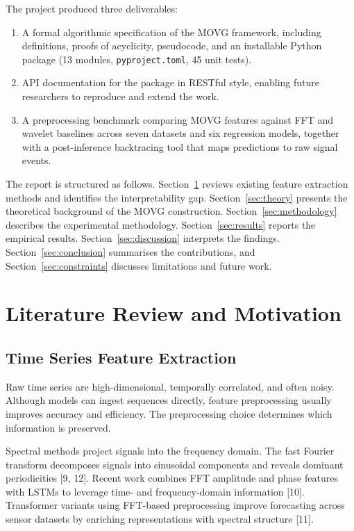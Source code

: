 \documentclass[a4paper,12pt]{article}
\begin{document}
The project produced three deliverables:

\begin{enumerate}[leftmargin=2em, itemsep=0.3em]
    \item A formal algorithmic specification of the MOVG framework, including definitions, proofs of acyclicity, pseudocode, and an installable Python package (13 modules, \texttt{pyproject.toml}, 45 unit tests).
    \item API documentation for the package in RESTful style, enabling future researchers to reproduce and extend the work.
    \item A preprocessing benchmark comparing MOVG features against FFT and wavelet baselines across seven datasets and six regression models, together with a post-inference backtracing tool that maps predictions to raw signal events.
\end{enumerate}

The report is structured as follows. Section~\ref{sec:lit-review} reviews existing feature extraction methods and identifies the interpretability gap. Section~\ref{sec:theory} presents the theoretical background of the MOVG construction. Section~\ref{sec:methodology} describes the experimental methodology. Section~\ref{sec:results} reports the empirical results. Section~\ref{sec:discussion} interprets the findings. Section~\ref{sec:conclusion} summarises the contributions, and Section~\ref{sec:constraints} discusses limitations and future work.

\section{Literature Review and Motivation}
\label{sec:lit-review}

\subsection{Time Series Feature Extraction}
\label{sec:lit-feature-extraction}

Raw time series are high-dimensional, temporally correlated, and often noisy. Although models can ingest sequences directly, feature preprocessing usually improves accuracy and efficiency. The preprocessing choice determines which information is preserved.

Spectral methods project signals into the frequency domain. The fast Fourier transform decomposes signals into sinusoidal components and reveals dominant periodicities [9, 12]. Recent work combines FFT amplitude and phase features with LSTMs to leverage time- and frequency-domain information [10]. Transformer variants using FFT-based preprocessing improve forecasting across sensor datasets by enriching representations with spectral structure [11].
\end{document}
